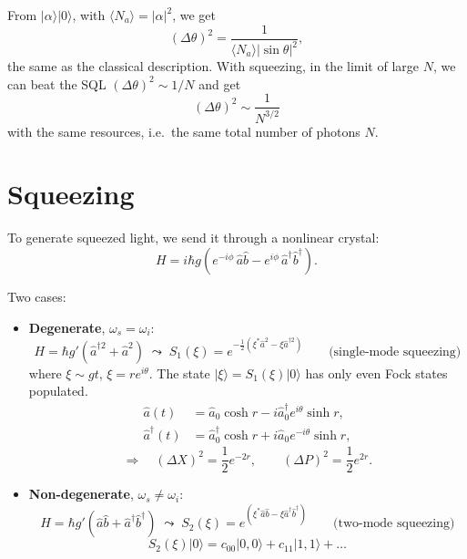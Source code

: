 \documentclass[11pt,a4paper]{article}
\newcommand{\ket}[1]{\lvert #1\rangle}
\newcommand{\expval}[1]{\langle #1\rangle}
\newcommand{\ad}{\hat a^\dagger}
\newcommand{\bd}{\hat b^\dagger}
\begin{document}
From $\ket\alpha\ket0$, with $\expval{N_a}=|\alpha|^2$, we get
\[
  (\Delta\theta)^2 = \frac{1}{\expval{N_a}|\sin\theta|^2},
\]
the same as the classical description. With squeezing, in the limit of large $N$, we can beat the SQL $(\Delta\theta)^2\sim1/N$ and get
\[
  (\Delta\theta)^2 \sim \frac{1}{N^{3/2}}
\]
with the same resources, i.e.\ the same total number of photons $N$.

\section{Squeezing}

To generate squeezed light, we send it through a nonlinear crystal:
\[
  H = i\hbar g\left(e^{-i\phi}\,\hat a\hat b - e^{i\phi}\,\ad\bd\right).
\]

\begin{center}
\end{center}

Two cases:
\begin{itemize}
  \item \textbf{Degenerate}, $\omega_s=\omega_i$:
  \[
    H = \hbar g'\left(\hat a^{\dagger2}+\hat a^2\right)
    \;\leadsto\; S_1(\xi) = e^{-\frac12\left(\xi^*\hat a^2-\xi\hat a^{\dagger2}\right)}
    \qquad\text{(single-mode squeezing)}
  \]
  where $\xi\sim gt$, $\xi=re^{i\theta}$. The state $\ket\xi=S_1(\xi)\ket0$ has only even Fock states populated.
  \begin{align*}
    \hat a(t) &= \hat a_0\cosh r - i\hat a_0^\dagger e^{i\theta}\sinh r,\\
    \hat a^\dagger(t) &= \hat a_0^\dagger\cosh r + i\hat a_0 e^{-i\theta}\sinh r,
  \end{align*}
  \[
    \Rightarrow\quad (\Delta X)^2 = \frac12 e^{-2r},\qquad (\Delta P)^2 = \frac12 e^{2r}.
  \]
  \item \textbf{Non-degenerate}, $\omega_s\neq\omega_i$:
  \[
    H = \hbar g'\left(\hat a\hat b+\ad\bd\right)
    \;\leadsto\; S_2(\xi) = e^{\left(\xi^*\hat a\hat b-\xi\ad\bd\right)}
    \qquad\text{(two-mode squeezing)}
  \]
  \[
    S_2(\xi)\ket{0} = c_{00}\ket{0,0} + c_{11}\ket{1,1} + \dots
  \]
\end{itemize}
\end{document}
